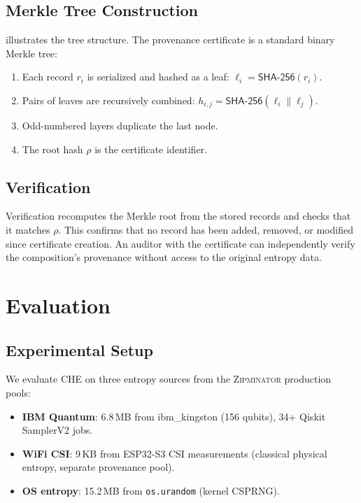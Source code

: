 \documentclass[conference,compsoc]{IEEEtran}
\newcommand{\zipminator}{\textsc{Zipminator}\xspace}
\newcommand{\che}{\textsc{CHE}\xspace}
\begin{document}
\subsection{Merkle Tree Construction}
\label{sec:provenance:merkle}

 illustrates the tree structure.
The provenance certificate is a standard binary Merkle tree:
\begin{enumerate}
  \item Each record $r_i$ is serialized and hashed as a leaf:
        $\ell_i = \mathsf{SHA\text{-}256}(r_i)$.
  \item Pairs of leaves are recursively combined:
        $h_{i,j} = \mathsf{SHA\text{-}256}(\ell_i \| \ell_j)$.
  \item Odd-numbered layers duplicate the last node.
  \item The root hash $\rho$ is the certificate identifier.
\end{enumerate}

\subsection{Verification}
\label{sec:provenance:verification}

Verification recomputes the Merkle root from the stored records and
checks that it matches $\rho$.
%
This confirms that no record has been added, removed, or modified
since certificate creation.
%
An auditor with the certificate can independently verify the
composition's provenance without access to the original entropy data.


\section{Evaluation}
\label{sec:evaluation}

\subsection{Experimental Setup}
\label{sec:eval:setup}

We evaluate \che on three entropy sources from the \zipminator
production pools:
\begin{itemize}
  \item \textbf{IBM Quantum}: 6.8\,MB from ibm\_kingston (156
        qubits), 34+ Qiskit SamplerV2 jobs.
  \item \textbf{WiFi CSI}: 9\,KB from ESP32-S3 CSI measurements
        (classical physical entropy,
        separate provenance pool).
  \item \textbf{OS entropy}: 15.2\,MB from \texttt{os.urandom}
        (kernel CSPRNG).
\end{itemize}
\end{document}
